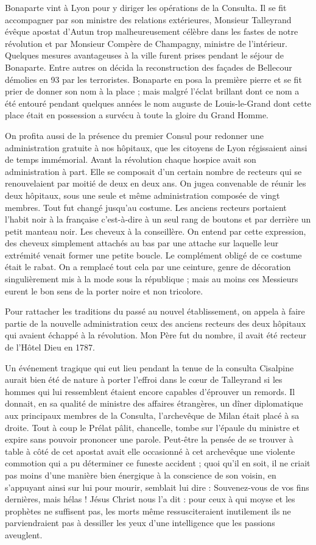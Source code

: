 \documentclass[11pt,a4paper]{report}
\begin{document}
Bonaparte vint à Lyon pour y diriger les opérations de la Consulta. Il se fit accompagner par son ministre des relations extérieures, Monsieur Talleyrand évêque apostat d'Autun trop malheureusement célèbre dans les fastes de notre révolution et par Monsieur Compère de Champagny, ministre de l'intérieur. Quelques mesures avantageuses à la ville furent prises pendant le séjour de Bonaparte. Entre autres on décida la reconstruction des façades de Bellecour démolies en 93 par les terroristes. Bonaparte en posa la première pierre et se fit prier de donner son nom à la place ; mais malgré l'éclat brillant dont ce nom a été entouré pendant quelques années le nom auguste de Louis-le-Grand dont cette place était en possession a survécu à toute la gloire du Grand Homme.

On profita aussi de la présence du premier Consul pour redonner une administration gratuite à nos hôpitaux, que les citoyens de Lyon régissaient ainsi de temps immémorial. Avant la révolution chaque hospice avait son administration à part. Elle se composait d'un certain nombre de recteurs qui se renouvelaient par moitié de deux en deux ans. On jugea convenable de réunir les deux hôpitaux, sous une seule et même administration composée de vingt membres. Tout fut changé jusqu'au costume. Les anciens recteurs portaient l'habit noir à la française c'est-à-dire à un seul rang de boutons et par derrière un petit manteau noir. Les cheveux à la conseillère. On entend par cette expression, des cheveux simplement attachés au bas par une attache sur laquelle leur extrémité venait former une petite boucle. Le complément obligé de ce costume était le rabat. On a remplacé tout cela par une ceinture, genre de décoration singulièrement mis à la mode sous la république ; mais au moins ces Messieurs eurent le bon sens de la porter noire et non tricolore.

Pour rattacher les traditions du passé au nouvel établissement, on appela à faire partie de la nouvelle administration ceux des anciens recteurs des deux hôpitaux qui avaient échappé à la révolution. Mon Père fut du nombre, il avait été recteur de l'Hôtel Dieu en 1787.

Un événement tragique qui eut lieu pendant la tenue de la consulta Cisalpine aurait bien été de nature à porter l'effroi dans le cœur de Talleyrand si les hommes qui lui ressemblent étaient encore capables d'éprouver un remords. Il donnait, en sa qualité de ministre des affaires étrangères, un dîner diplomatique aux principaux membres de la Consulta, l'archevêque de Milan était placé à sa droite. Tout à coup le Prélat pâlit, chancelle, tombe sur l'épaule du ministre et expire sans pouvoir prononcer une parole. Peut-être la pensée de se trouver à table à côté de cet apostat avait elle occasionné à cet archevêque une violente commotion qui a pu déterminer ce funeste accident ; quoi qu'il en soit, il ne criait pas moins d'une manière bien énergique à la conscience de son voisin, en s'appuyant ainsi sur lui pour mourir, semblait lui dire : Souvenez-vous de vos fins dernières, mais hélas ! Jésus Christ nous l'a dit : pour ceux à qui moyse et les prophètes ne suffisent pas, les morts même ressusciteraient inutilement ils ne parviendraient pas à dessiller les yeux d'une intelligence que les passions aveuglent.
\end{document}
